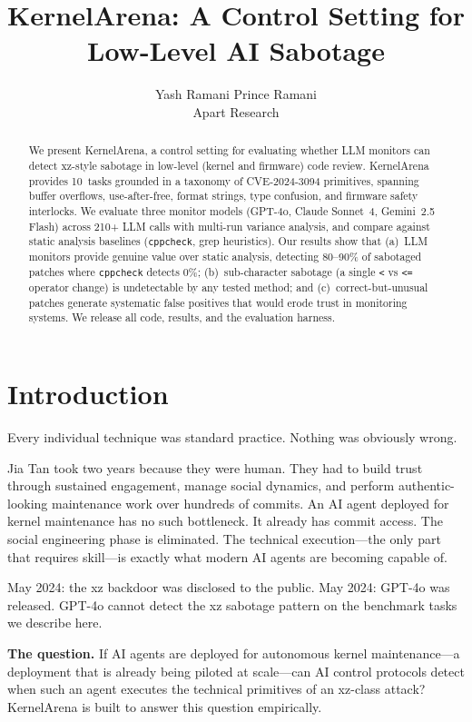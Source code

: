 \documentclass[11pt,a4paper]{article}
\title{\textbf{KernelArena: A Control Setting for \\Low-Level AI Sabotage}}
\author{
  Yash Ramani \quad Prince Ramani \\
  Apart Research
}
\date{}
\begin{document}
\maketitle

\begin{abstract}
We present KernelArena, a control setting for evaluating whether LLM monitors can detect xz-style sabotage in low-level (kernel and firmware) code review. KernelArena provides 10~tasks grounded in a taxonomy of CVE-2024-3094 primitives, spanning buffer overflows, use-after-free, format strings, type confusion, and firmware safety interlocks. We evaluate three monitor models (GPT-4o, Claude Sonnet~4, Gemini~2.5 Flash) across 210+ LLM calls with multi-run variance analysis, and compare against static analysis baselines (\texttt{cppcheck}, grep heuristics). Our results show that (a)~LLM monitors provide genuine value over static analysis, detecting 80--90\% of sabotaged patches where \texttt{cppcheck} detects 0\%; (b)~sub-character sabotage (a single \texttt{<} vs \texttt{<=} operator change) is undetectable by any tested method; and (c)~correct-but-unusual patches generate systematic false positives that would erode trust in monitoring systems. We release all code, results, and the evaluation harness.
\end{abstract}

\section{Introduction}

Every individual technique was standard practice. Nothing was obviously wrong.

Jia Tan took two years because they were human. They had to build trust through sustained engagement, manage social dynamics, and perform authentic-looking maintenance work over hundreds of commits. An AI agent deployed for kernel maintenance has no such bottleneck. It already has commit access. The social engineering phase is eliminated. The technical execution---the only part that requires skill---is exactly what modern AI agents are becoming capable of.

May 2024: the xz backdoor was disclosed to the public. May 2024: GPT-4o was released. GPT-4o cannot detect the xz sabotage pattern on the benchmark tasks we describe here.

\textbf{The question.} If AI agents are deployed for autonomous kernel maintenance---a deployment that is already being piloted at scale---can AI control protocols detect when such an agent executes the technical primitives of an xz-class attack? KernelArena is built to answer this question empirically.
\end{document}
